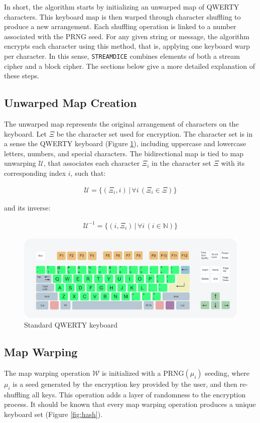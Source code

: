 \documentclass{article}
\begin{document}
In short, the algorithm starts by initializing an unwarped map of QWERTY characters. 
This keyboard map is then warped through character shuffling to produce a new arrangement. 
Each shuffling operation is linked to a number associated with the PRNG seed. 
For any given string or message, the algorithm encrypts each character using this method, that is,
applying one keyboard warp per character. In this sense, \texttt{STREAMDICE} combines elements of both a stream cipher and a block cipher. 
The sections below give a more detailed explanation of these steps.



\subsection{Unwarped Map Creation}
The unwarped map represents the original arrangement of characters on the keyboard. Let \( \Xi \) be the
character set used for encryption. The character set is in a sense the QWERTY keyboard (Figure \ref{fig:keyboard}), 
including uppercase and lowercase letters, numbers, and special characters. 
The bidirectional map is tied to map unwarping \( \mathcal{U} \), that associates each character \( \Xi_i \) in the character set \( \Xi \) 
with its corresponding index \( i \), such that:

\begin{align}
    \mathcal{U} = \{ (\Xi_i, i) \, | \, \forall i \, (\Xi_i \in \Xi) \}
\end{align}

and its inverse:

\begin{align}
    \mathcal{U}^{-1} = \{ (i, \Xi_i) \, | \, \forall i \, (i \in \mathbb{N}) \}
\end{align}


\begin{figure}[h]
  \centering
  \includegraphics[width=0.7\linewidth]{img/qwerty.png}
  \caption{Standard QWERTY keyboard}
  \label{fig:keyboard}
\end{figure}


\subsection{Map Warping}
The map warping operation \( \mathcal{W} \) is initialized with a  \( \text{PRNG}(\mu_i) \) seeding, 
where \( \mu_i \) is a seed generated by the encryption key provided by the user, and then re-shuffling all keys. 
This operation adds a layer of randomness to the encryption process. It should be known that every map warping operation
produces a unique keyboard set (Figure \ref{fig:hash}).
\end{document}
